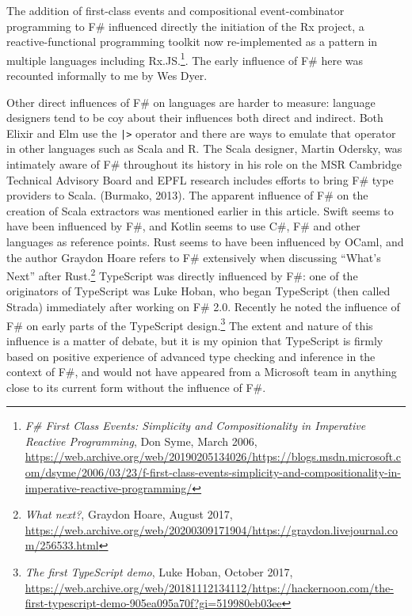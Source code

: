 \documentclass[acmsmall]{acmart}\settopmatter{}
\begin{document}
The addition of first-class events and compositional event-combinator programming to F\# influenced directly the initiation
of the Rx project, a reactive-functional programming toolkit now re-implemented as a pattern in multiple languages
including Rx.JS.\footnote{\textit{F\# First Class Events: Simplicity and Compositionality in Imperative Reactive Programming}, Don Syme, March 2006, \url{https://web.archive.org/web/20190205134026/https://blogs.msdn.microsoft.com/dsyme/2006/03/23/f-first-class-events-simplicity-and-compositionality-in-imperative-reactive-programming/}}.   The early influence of F\# here was recounted informally to me by Wes Dyer. 

Other direct influences of F\# on languages are harder to measure: language designers tend to be coy about their
influences both direct and indirect. Both Elixir and Elm use the \texttt{|>} operator and there are ways to emulate that operator
in other languages such as Scala and R. The Scala designer, Martin Odersky, was intimately aware of F\# throughout
its history in his role on the MSR Cambridge Technical Advisory Board and EPFL research includes efforts to
bring F\# type providers to Scala. (Burmako, 2013).  The apparent influence of F\# on the
creation of Scala extractors was mentioned earlier in this article. Swift seems to have been influenced
by F\#, and Kotlin seems to use C\#, F\# and other languages as reference points.  Rust seems to have been
influenced by OCaml, and the author Graydon Hoare refers to F\# extensively when discussing “What’s Next” after
Rust.\footnote{\textit{What next?}, Graydon Hoare, August 2017, \url{https://web.archive.org/web/20200309171904/https://graydon.livejournal.com/256533.html}}
TypeScript was directly influenced by F\#: one of the originators of TypeScript was
Luke Hoban, who began TypeScript (then called Strada) immediately after working on F\# 2.0. Recently
he noted the influence of F\# on early parts of the TypeScript
design.\footnote{\textit{The first TypeScript demo}, Luke Hoban, October 2017, \url{https://web.archive.org/web/20181112134112/https://hackernoon.com/the-first-typescript-demo-905ea095a70f?gi=519980eb03ee}} The
extent and nature of this influence is a matter of debate, but it is my opinion that TypeScript is firmly based on positive experience of advanced type checking and inference
in the context of F\#, and would not have appeared from a Microsoft team in anything close to its current form without the influence of F\#.
\end{document}

